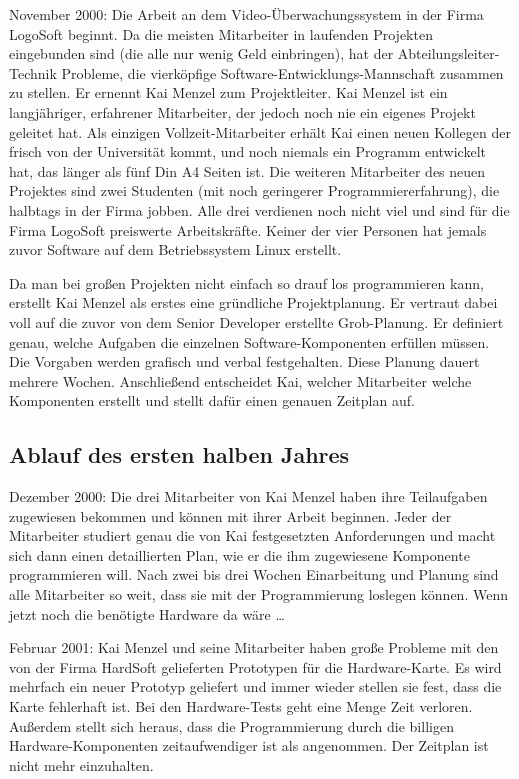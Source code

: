 November 2000: Die Arbeit an dem Video-Überwachungssystem in der Firma LogoSoft
beginnt. Da die meisten Mitarbeiter in laufenden Projekten eingebunden sind
(die alle nur wenig Geld einbringen), hat der Abteilungsleiter-Technik
Probleme, die vierköpfige Software-Entwicklungs-Mannschaft zusammen zu stellen.
Er ernennt Kai Menzel zum Projektleiter. Kai Menzel ist ein langjähriger,
erfahrener Mitarbeiter, der jedoch noch nie ein eigenes Projekt geleitet hat.
Als einzigen Vollzeit-Mitarbeiter erhält Kai einen neuen Kollegen der frisch
von der Universität kommt, und noch niemals ein Programm entwickelt hat, das
länger als fünf Din A4 Seiten ist. Die weiteren Mitarbeiter des neuen Projektes
sind zwei Studenten (mit noch geringerer Programmiererfahrung), die halbtags in
der Firma jobben. Alle drei verdienen noch nicht viel und sind für die Firma
LogoSoft preiswerte Arbeitskräfte. Keiner der vier Personen hat jemals zuvor
Software auf dem Betriebssystem Linux erstellt.

Da man bei großen Projekten nicht einfach so drauf los programmieren kann,
erstellt Kai Menzel als erstes eine gründliche Projektplanung. Er vertraut
dabei voll auf die zuvor von dem Senior Developer erstellte Grob-Planung. Er
definiert genau, welche Aufgaben die einzelnen Software-Komponenten erfüllen
müssen. Die Vorgaben werden grafisch und verbal festgehalten. Diese Planung
dauert mehrere Wochen. Anschließend entscheidet Kai, welcher Mitarbeiter welche
Komponenten erstellt und stellt dafür einen genauen Zeitplan auf.

\subsection{Ablauf des ersten halben Jahres}

Dezember 2000: Die drei Mitarbeiter von Kai Menzel haben ihre Teilaufgaben
zugewiesen bekommen und können mit ihrer Arbeit beginnen. Jeder der Mitarbeiter
studiert genau die von Kai festgesetzten Anforderungen und macht sich dann
einen detaillierten Plan, wie er die ihm zugewiesene Komponente programmieren
will. Nach zwei bis drei Wochen Einarbeitung und Planung sind alle Mitarbeiter
so weit, dass sie mit der Programmierung loslegen können. Wenn jetzt noch die
benötigte Hardware da wäre \ldots

Februar 2001: Kai Menzel und seine Mitarbeiter haben große Probleme mit den von
der Firma HardSoft gelieferten Prototypen für die Hardware-Karte. Es wird
mehrfach ein neuer Prototyp geliefert und immer wieder stellen sie fest, dass
die Karte fehlerhaft ist. Bei den Hardware-Tests geht eine Menge Zeit verloren.
Außerdem stellt sich heraus, dass die Programmierung durch die billigen
Hardware-Komponenten zeitaufwendiger ist als angenommen. Der Zeitplan ist nicht
mehr einzuhalten.


